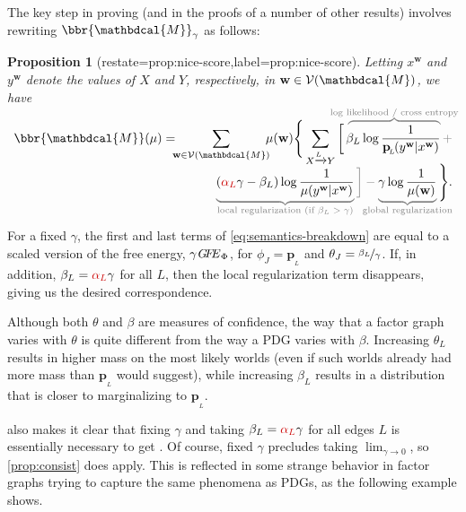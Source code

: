 \documentclass[letterpaper]{article} %
\theoremstyle{plain}
\newtheorem{prop}[theorem]{Proposition}
\theoremstyle{definition}
\theoremstyle{remark}
\newcommand{\commentout}[1]{\ignorespaces}
\newcommand{\valpha}[1]{{\color{red!80!black}#1}}
\newcommand\mat[1]{\mathbf{#1}}
\newcommand{\dg}[1]{\mathbdcal{#1}}
\newcommand\GFE{\mathit{G\mkern-4mu F\mkern-4.5mu E}}
\newcommand{\bp}[1][L]{\mat{p}_{\!_{#1}\!}}
\newcommand{\V}{\mathcal V}
\begin{document}
The key step in proving 
(and in the proofs of a number of other results) involves 
rewriting  
$\bbr{\dg M}_\gamma$ as follows: 
\begin{prop}[restate=prop:nice-score,label=prop:nice-score]%
Letting $x^{\mat w}$ and $y^{\mat w}$ denote the values of
$X$ and $Y$, respectively, in $\mat w \in \V(\dg M)$, 
we have 
\begin{equation}\label{eq:semantics-breakdown}
\begin{split}
\bbr{\dg M}(\mu) =  \!\!\!\sum_{\mat w \in \V(\dg M)} \!\!\! \mu(\mat w) \Bigg\{
\sum_{ X \xrightarrow{\!\!L} Y  }
\bigg[\,
\color{gray}\overbrace{\color{black}
\!\beta_L \log \frac{1}{\bp(y^{\mat w} |x^{\mat w})}
}^{\color{gray}\smash{\mathclap{\text{log likelihood / cross entropy}}}} + \\[-0.5em]
\color{gray}\underbrace{\color{black} 
(\valpha{\alpha_L}\gamma - \beta_L ) \log \frac{1}{\mu(y^{\mat w} |x^{\mat w})} 
}_{\color{gray}\smash{\mathclap{\text{local regularization (if $\beta_L > \gamma$)}}}}\bigg] - \underbrace{\color{black}
\gamma \log \frac{1}{\mu(\mat w)}
}_{\color{gray}\smash{\mathclap{\text{global
			regularization}}}}\color{black} \Bigg\} .
\end{split}
\end{equation}
\end{prop}

For a fixed $\gamma$, the first and last terms
of \eqref{eq:semantics-breakdown} are equal to a scaled
version of the free energy, $\gamma\GFE_\Phi$, for $\phi_J = \bp$ and $\theta_J
= \nicefrac{\beta_L}{\gamma}$.  
If, in addition, $\beta_L = \valpha{\alpha_L}\gamma$ for all
$L$, then
the local regularization term disappears, giving us
the desired correspondence. 

Although both $\theta$ and $\beta$ are measures of confidence, 
the way that a factor graph varies with $\theta$ 
is quite different from the way a PDG
varies with $\beta$. Increasing $\theta_L$ results in higher mass on the most likely worlds (even if such worlds already had more mass than $\bp$ would suggest), while increasing $\beta_L$ results in a distribution that is closer to marginalizing to $\bp$. 
\commentout{
	We now explain how the middle term may be viewed as a ``local'' regularization,
	and why including such a term is necessary for the semantics to 
	view our cpds $\mat p$ as assertions about probability
}

 also makes it clear that 
fixing $\gamma$ and
taking $\beta_L = \valpha{\alpha_L} \gamma$ for all edges $L$ is
essentially necessary to get .
Of course, fixed $\gamma$ precludes taking $\lim_{\gamma\to0}$, so \cref{prop:consist} does apply. 
This is reflected in some strange
behavior in factor graphs trying to capture the same phenomena as
PDGs, as the following example shows.
\end{document}
